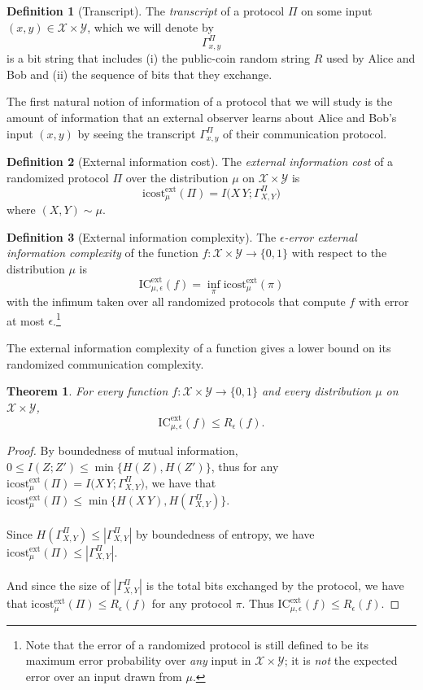 \documentclass[11pt,oneside]{book}
\theoremstyle{plain}
\newtheorem{theorem}{Theorem}
\theoremstyle{definition}
\newtheorem{definition}{Definition}
\theoremstyle{plain}
\newcommand{\calX}{\mathcal{X}}
\newcommand{\calY}{\mathcal{Y}}
\newcommand{\ICext}{\mathrm{IC}^{\mathrm{ext}}}
\newcommand{\icostext}{\mathrm{icost}^{\mathrm{ext}}}
\begin{document}
\begin{definition}[Transcript]
	The \emph{transcript} of a protocol $\Pi$ on some input $(x,y) \in \calX \times \calY$, which we will denote by
	\[
	\Gamma_{x,y}^\Pi
	\]
	is a bit string that includes (i) the public-coin random string $R$ used by Alice and Bob and (ii) the sequence of bits that they exchange. 
\end{definition}

The first natural notion of information of a protocol that we will study is the amount of information that an external observer learns about Alice and Bob's input $(x,y)$ by seeing the transcript $\Gamma_{x,y}^\Pi$ of their communication protocol.

\begin{definition}[External information cost]
	The \emph{external information cost} of a randomized protocol $\Pi$ over the distribution $\mu$ on $\calX \times \calY$ is
	\[
	\icostext_\mu(\Pi) = I\big( X\,Y ; \Gamma_{X,Y}^\Pi \big)
	\]
	where $(X,Y) \sim \mu$.
\end{definition}

\begin{definition}[External information complexity]
	The \emph{$\epsilon$-error external information complexity} of the function $f : \calX \times \calY \to \{0,1\}$ with respect to the distribution $\mu$ is
	\[
	\ICext_{\mu,\epsilon}(f) = \inf_{\pi} \icostext_\mu(\pi)
	\]
	with the infimum taken over all randomized protocols that compute $f$ with error at most $\epsilon$.\footnote{Note that the error of a randomized protocol is still defined to be its maximum error probability over \emph{any} input in $\calX \times \calY$; it is \emph{not} the expected error over an input drawn from $\mu$.}
\end{definition}

The external information complexity of a function gives a lower bound on its randomized communication complexity.

\begin{theorem}
	For every function $f : \calX \times \calY \to \{0,1\}$ and every distribution $\mu$ on $\calX \times \calY$,
	\[
	\ICext_{\mu,\epsilon}(f) \le R_\epsilon(f).
	\]
\end{theorem}

\begin{proof}
	By boundedness of mutual information, $0 \le I(Z ; Z') \le \min\{ H(Z), H(Z') \}$, thus for any $\icostext_\mu(\Pi) = I\big( X\,Y ; \Gamma_{X,Y}^\Pi \big)$, we have that $\icostext_\mu(\Pi) \leq \min\{ H(X\,Y), H(\Gamma_{X,Y}^\Pi) \}$.\\
	\\
	Since $H(\Gamma_{X,Y}^\Pi) \leq |\Gamma_{X,Y}^\Pi|$ by boundedness of entropy, we have $\icostext_\mu(\Pi) \leq |\Gamma_{X,Y}^\Pi|$.\\
	\\
	And since the size of $|\Gamma_{X,Y}^\Pi|$ is the total bits exchanged by the protocol, we have that $\icostext_\mu(\Pi) \leq R_\epsilon(f)$ for any protocol $\pi$. Thus $\ICext_{\mu,\epsilon}(f) \le R_\epsilon(f)$.
\end{proof}
\end{document}

